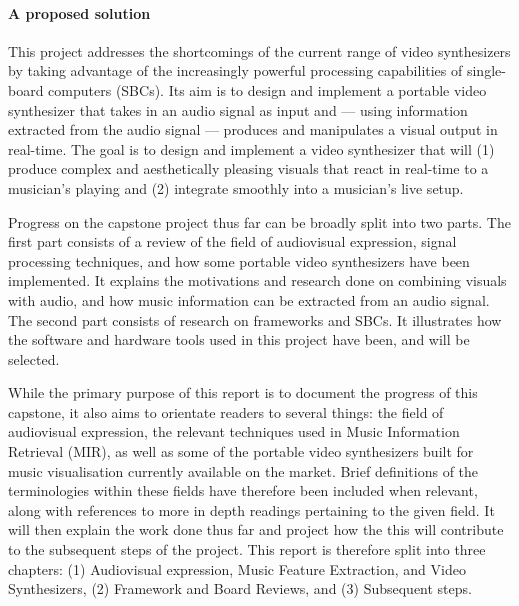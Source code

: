 \documentclass{report}
\begin{document}
\paragraph{A proposed solution}
This project addresses the shortcomings of the current range of video synthesizers by taking advantage of the increasingly powerful processing capabilities of single-board computers (SBCs). Its aim is to design and implement a portable video synthesizer that takes in an audio signal as input and --- using information extracted from the audio signal --- produces and manipulates a visual output in real-time. The goal is to design and implement a video synthesizer that will (1) produce complex and aesthetically pleasing visuals that react in real-time to a musician's playing and (2) integrate smoothly into a musician's live setup. \par

Progress on the capstone project thus far can be broadly split into two parts. The first part consists of a review of the field of audiovisual expression, signal processing techniques, and how some portable video synthesizers have been implemented. It explains the motivations and research done on combining visuals with audio, and how music information can be extracted from an audio signal. The second part consists of research on frameworks and SBCs. It illustrates how the software and hardware tools used in this project have been, and will be selected. \par

While the primary purpose of this report is to document the progress of this capstone, it also aims to orientate readers to several things: the field of audiovisual expression, the relevant techniques used in Music Information Retrieval (MIR), as well as some of the portable video synthesizers built for music visualisation currently available on the market. Brief definitions of the terminologies within these fields have therefore been included when relevant, along with references to more in depth readings pertaining to the given field. It will then explain the work done thus far and project how the this will contribute to the subsequent steps of the project. This report is therefore split into three chapters: (1) Audiovisual expression, Music Feature Extraction, and Video Synthesizers, (2) Framework and Board Reviews, and (3) Subsequent steps.
\end{document}
